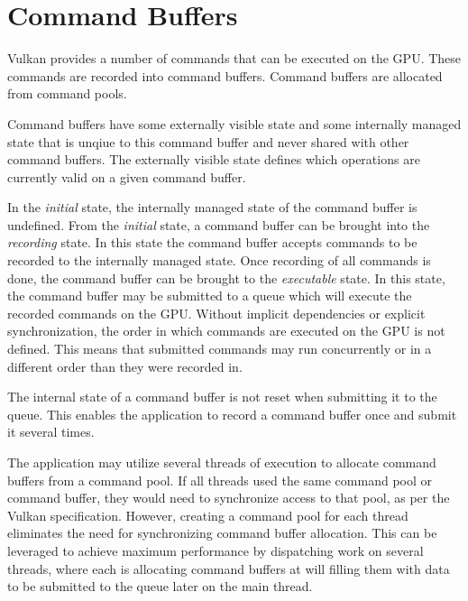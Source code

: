 
  \section{Command Buffers}
  \label{sec:CommandBuffers}
    Vulkan provides a number of commands that can be executed on the GPU. These commands are recorded into command buffers. Command buffers are allocated from command pools.

    Command buffers have some externally visible state and some internally managed state that is unqiue to this command buffer and never shared with other command buffers. The externally visible state defines which operations are currently valid on a given command buffer.

    In the \textit{initial} state, the internally managed state of the command buffer is undefined. From the \textit{initial} state, a command buffer can be brought into the \textit{recording} state. In this state the command buffer accepts commands to be recorded to the internally managed state. Once recording of all commands is done, the command buffer can be brought to the \textit{executable} state. In this state, the command buffer may be submitted to a queue which will execute the recorded commands on the GPU. Without implicit dependencies or explicit synchronization, the order in which commands are executed on the GPU is not defined. This means that submitted commands may run concurrently or in a different order than they were recorded in.

    The internal state of a command buffer is not reset when submitting it to the queue. This enables the \gls{application} to record a command buffer once and submit it several times.

    The \gls{application} may utilize several threads of execution to allocate command buffers from a command pool. If all threads used the same command pool or command buffer, they would need to synchronize access to that pool, as per the Vulkan specification. However, creating a command pool for each thread eliminates the need for synchronizing command buffer allocation. This can be leveraged to achieve maximum performance by dispatching work on several threads, where each is allocating command buffers at will filling them with data to be submitted to the queue later on the main thread.

